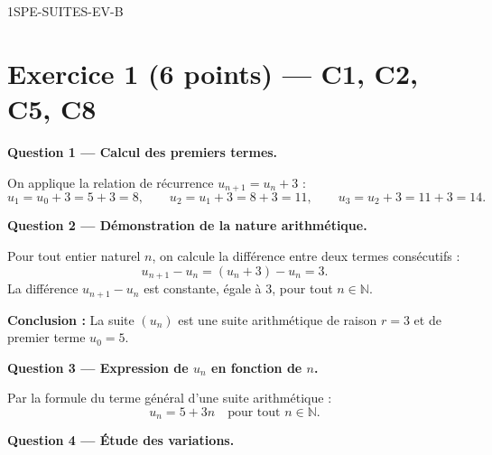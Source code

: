 
\begin{corrige}{1SPE-SUITES-EV-B}

\section*{Exercice 1 \hfill (6 points) — C1, C2, C5, C8}


\bigskip
\textbf{Question 1 — Calcul des premiers termes.}


On applique la relation de récurrence $u_{n+1} = u_n + 3$ :
\[
  u_1 = u_0 + 3 = 5 + 3 = 8, \qquad
  u_2 = u_1 + 3 = 8 + 3 = 11, \qquad
  u_3 = u_2 + 3 = 11 + 3 = 14.
\]

\medskip
\textbf{Question 2 — Démonstration de la nature arithmétique.}


Pour tout entier naturel $n$, on calcule la différence entre deux termes consécutifs :
\[
  u_{n+1} - u_n = (u_n + 3) - u_n = 3.
\]
La différence $u_{n+1} - u_n$ est constante, égale à $3$, pour tout $n \in \mathbb{N}$.

\textbf{Conclusion :} La suite $(u_n)$ est une suite arithmétique de raison $r = 3$ et de premier terme $u_0 = 5$.

\medskip
\textbf{Question 3 — Expression de $u_n$ en fonction de $n$.}


Par la formule du terme général d'une suite arithmétique :
\[
  \boxed{u_n = 5 + 3n} \quad \text{pour tout } n \in \mathbb{N}.
\]

\medskip
\textbf{Question 4 — Étude des variations.}


\end{corrige}
